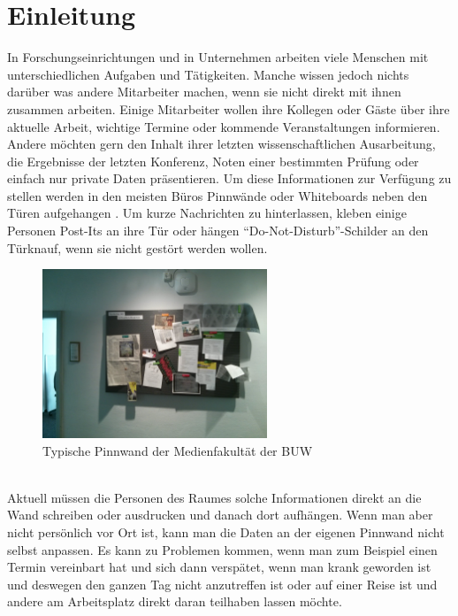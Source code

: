 \chapter{Einleitung}\label{Einleitung}
In Forschungseinrichtungen und in Unternehmen arbeiten viele Menschen mit unterschiedlichen Aufgaben und Tätigkeiten.
Manche wissen jedoch nichts darüber was andere Mitarbeiter machen, wenn sie nicht direkt mit ihnen zusammen arbeiten.
Einige Mitarbeiter wollen ihre Kollegen oder Gäste über ihre aktuelle Arbeit, wichtige Termine oder kommende Veranstaltungen informieren.
Andere möchten gern den Inhalt ihrer letzten wissenschaftlichen Ausarbeitung, die Ergebnisse der letzten Konferenz, Noten einer bestimmten Prüfung oder einfach nur private Daten präsentieren.
Um diese Informationen zur Verfügung zu stellen werden in den meisten Büros Pinnwände oder Whiteboards neben den Türen aufgehangen . Um kurze Nachrichten zu hinterlassen, kleben einige Personen Post-Its an ihre Tür oder hängen ``Do-Not-Disturb''-Schilder an den Türknauf, wenn sie nicht gestört werden wollen.
\\
\begin{figure}[h!]
  \centering
    \includegraphics[width=0.6\textwidth]{./img/pinnwand.jpg}
  \caption{Typische Pinnwand der Medienfakultät der BUW}
  \label{img:pinnwand}
\end{figure}
\\
Aktuell müssen die Personen des Raumes solche Informationen direkt an die Wand schreiben oder ausdrucken und danach dort aufhängen.
Wenn man aber nicht persönlich vor Ort ist, kann man die Daten an der eigenen Pinnwand nicht selbst anpassen.
Es kann zu Problemen kommen, wenn man zum Beispiel einen Termin vereinbart hat und sich dann verspätet, wenn man krank geworden ist und deswegen den ganzen Tag nicht anzutreffen ist oder auf einer Reise ist und andere am Arbeitsplatz direkt daran teilhaben lassen möchte.
\\
